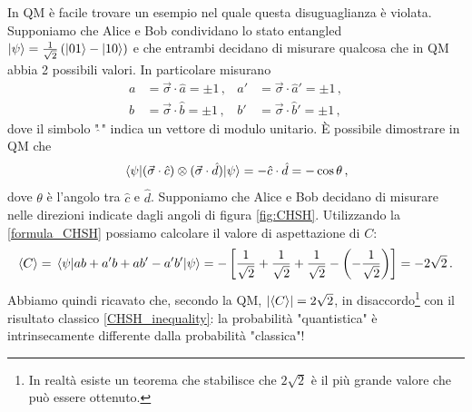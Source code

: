 \noindent In QM è facile trovare un esempio nel quale questa disuguaglianza è violata. Supponiamo che Alice e Bob condividano lo stato entangled $\ket{\psi} = \frac{1}{\sqrt{2}} \left( \ket{01} - \ket{10} \right)$ e che entrambi decidano di misurare qualcosa che in QM abbia 2 possibili valori. In particolare misurano
\begin{align*}
    a &= \vec{\sigma} \cdot \hat{a} = \pm 1 \, , &a' &= \vec{\sigma} \cdot \hat{a}' = \pm 1 \, , \\
    b &= \vec{\sigma} \cdot \hat{b} = \pm 1 \, , &b' &= \vec{\sigma} \cdot \hat{b}' = \pm 1 \, ,
\end{align*}
dove il simbolo "$\hat{\,}$" indica un vettore di modulo unitario. È possibile dimostrare in QM che
\begin{equation}\label{formula_CHSH}
    \expval{(\vec{\sigma} \cdot \hat{c}) \otimes (\vec{\sigma} \cdot \hat{d})}{\psi} = - \hat{c} \cdot \hat{d} = - \cos \theta \, ,
\end{equation}
dove $\theta$ è l'angolo tra $\hat{c}$ e $\hat{d}$. Supponiamo che Alice e Bob decidano di misurare nelle direzioni indicate dagli angoli di figura \ref{fig:CHSH}. Utilizzando la \eqref{formula_CHSH} possiamo calcolare il valore di aspettazione di $C$:
\begin{equation*}
    \expval{C} = \expval{ab + a'b + a b' - a'b'}{\psi} = - \left[ \frac{1}{\sqrt{2}} + \frac{1}{\sqrt{2}} + \frac{1}{\sqrt{2}} - \left( -\frac{1}{\sqrt{2}} \right) \right] = -2\sqrt{2} \, .
\end{equation*}
Abbiamo quindi ricavato che, secondo la QM, $\abs{\expval{C}} = 2\sqrt{2}$, in disaccordo\footnote{In realtà esiste un teorema che stabilisce che $2\sqrt{2}$ è il più grande valore che può essere ottenuto.} con il risultato classico \eqref{CHSH_inequality}: la probabilità "quantistica" è intrinsecamente differente dalla probabilità "classica"! 

